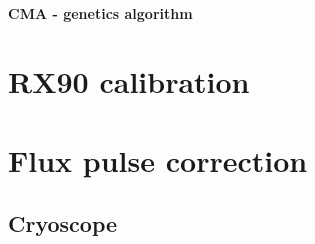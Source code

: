 \paragraph{CMA - genetics algorithm}
\cite{cmaessimplepractical}

\section{RX90 calibration}

\section{Flux pulse correction}
\subsection{Cryoscope}
\cite{rol_time-domain_2020}
\begin{comment}
    TO DO LIST:
    * calcoli analitic per assunzioni del cryoscope
    * calcoli analitici di convoluzioni per dimostrare che è giusto il modo in cui combiniamo i filtri
    * costruire script per analisi dati
    * eventualmente provare ad aggiungere più correzioni esponenziali
\end{comment}
